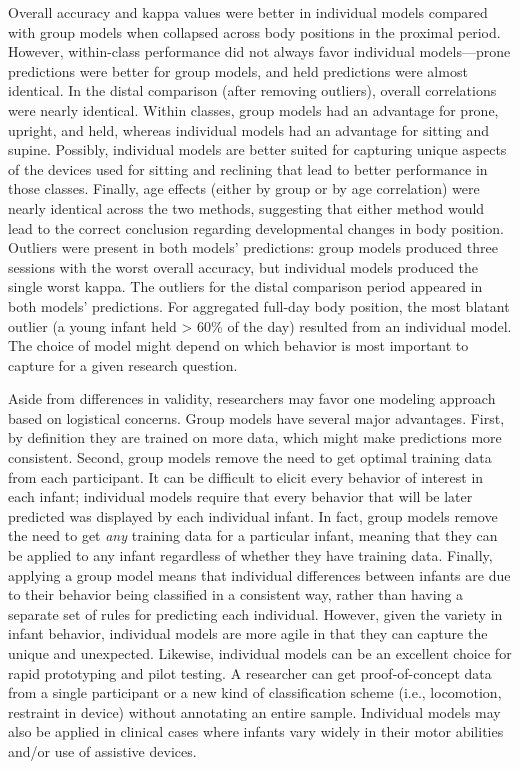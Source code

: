 \documentclass[
  man]{apa6}
\begin{document}
Overall accuracy and kappa values were better in individual models compared with group models when collapsed across body positions in the proximal period. However, within-class performance did not always favor individual models---prone predictions were better for group models, and held predictions were almost identical. In the distal comparison (after removing outliers), overall correlations were nearly identical. Within classes, group models had an advantage for prone, upright, and held, whereas individual models had an advantage for sitting and supine. Possibly, individual models are better suited for capturing unique aspects of the devices used for sitting and reclining that lead to better performance in those classes. Finally, age effects (either by group or by age correlation) were nearly identical across the two methods, suggesting that either method would lead to the correct conclusion regarding developmental changes in body position. Outliers were present in both models' predictions: group models produced three sessions with the worst overall accuracy, but individual models produced the single worst kappa. The outliers for the distal comparison period appeared in both models' predictions. For aggregated full-day body position, the most blatant outlier (a young infant held \textgreater{} 60\% of the day) resulted from an individual model. The choice of model might depend on which behavior is most important to capture for a given research question.

Aside from differences in validity, researchers may favor one modeling approach based on logistical concerns. Group models have several major advantages. First, by definition they are trained on more data, which might make predictions more consistent. Second, group models remove the need to get optimal training data from each participant. It can be difficult to elicit every behavior of interest in each infant; individual models require that every behavior that will be later predicted was displayed by each individual infant. In fact, group models remove the need to get \emph{any} training data for a particular infant, meaning that they can be applied to any infant regardless of whether they have training data. Finally, applying a group model means that individual differences between infants are due to their behavior being classified in a consistent way, rather than having a separate set of rules for predicting each individual. However, given the variety in infant behavior, individual models are more agile in that they can capture the unique and unexpected. Likewise, individual models can be an excellent choice for rapid prototyping and pilot testing. A researcher can get proof-of-concept data from a single participant or a new kind of classification scheme (i.e., locomotion, restraint in device) without annotating an entire sample. Individual models may also be applied in clinical cases where infants vary widely in their motor abilities and/or use of assistive devices.
\end{document}
